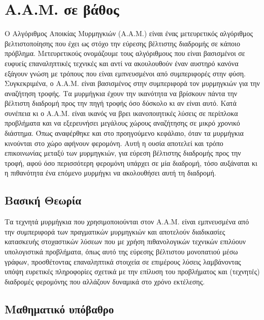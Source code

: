 \section{Α.Α.Μ. σε βάθος}
Ο Αλγόριθμος Αποικίας Μυρμηγκιών (Α.Α.Μ.) είναι ένας μετευρετικός αλγόριθμος βελτιστοποίησης που έχει ως στόχο την εύρεσης βέλτιστης διαδρομής σε κάποιο πρόβλημα. Μετευρετικούς ονομάζουμε τους αλγόριθμους που είναι βασισμένοι σε ευφυείς επαναληπτικές τεχνικές και αντί να ακουλουθούν έναν αυστηρό κανόνα εξάγουν γνώση με τρόπους που είναι εμπνευσμένοι από συμπεριφορές στην φύση. \cite{Maniezzo} Συγκεκριμένα, ο Α.Α.Μ. είναι βασισμένος στην συμπεριφορά τον μυρμηγκιών για την αναζήτηση τροφής. 
Τα μυρμήγκια έχουν την ικανότητα να βρίσκουν πάντα την βέλτιστη διαδρομή προς την πηγή τροφής όσο δύσκολο κι αν είναι αυτό. Κατά συνέπεια κι ο Α.Α.Μ. είναι ικανός να βρει ικανοποιητικές λύσεις σε περίπλοκα προβλήματα και να εξερευνήσει μεγάλους χώρους αναζήτησης σε μικρό χρονικό διάστημα. Όπως αναφέρθηκε και στο προηγούμενο κεφάλαιο, όταν τα μυρμήγκια κινούνται στο χώρο αφήνουν φερομόνη. Αυτή η ουσία αποτελεί και τρόπο επικοινωνίας μεταξύ των μυρμηγκιών, για εύρεση βέλτιστης διαδρομής προς την τροφή, αφού όσο περισσότερη φερομόνη υπάρχει σε μία διαδρομή, τόσο αυξάναται κι η πιθανότητα ένα επόμενο μυρμήγκι να ακολουθήσει αυτή τη διαδρομή. 

\subsection{Βασική Θεωρία}
Τα τεχνητά μυρμήγκια που χρησιμοποιούνται στον Α.Α.Μ. είναι εμπνευσμένα από την συμπεριφορά των πραγματικών μυρμηγκιών και αποτελούν διαδικασίες κατασκευής στοχαστικών λύσεων που με χρήση πιθανολογικών τεχνικών επιλύουν υπολογιστικά προβλήματα, όπως αυτό της εύρεσης βέλτιστου μονοπατιού μέσω γράφων, προσθέτοντας επαναληπτικά στοιχεία σε επιμέρους λύσεις λαμβάνοντας υπόψη ευρετικές πληροφορίες σχετικά με την επίλυση του προβλήματος και (τεχνητές) διαδρομές φερομόνης που αλλάζουν δυναμικά στο χρόνο εκτέλεσης. \cite{Dorigo-Stützle}

\subsection{Μαθηματικό υπόβαθρο}


